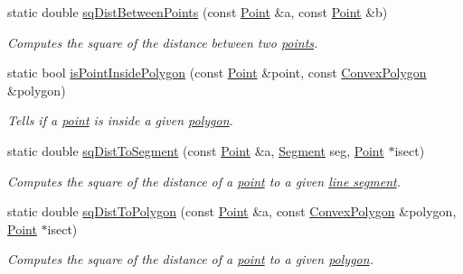\begin{DoxyCompactItemize}
static double \hyperlink{classPathFinder_a6757759823a710c8159d2d5f25912a62}{sqDistBetweenPoints} (const \hyperlink{structPathFinder_1_1Point}{Point} \&a, const \hyperlink{structPathFinder_1_1Point}{Point} \&b)
\begin{DoxyCompactList}\small\item\em Computes the square of the distance between two \hyperlink{structPathFinder_1_1Point}{points}. \item\end{DoxyCompactList}\item 
static bool \hyperlink{classPathFinder_a06935489b090eb301d58a27a461c556f}{isPointInsidePolygon} (const \hyperlink{structPathFinder_1_1Point}{Point} \&point, const \hyperlink{structPathFinder_1_1ConvexPolygon}{ConvexPolygon} \&polygon)
\begin{DoxyCompactList}\small\item\em Tells if a \hyperlink{structPathFinder_1_1Point}{point} is inside a given \hyperlink{structPathFinder_1_1ConvexPolygon}{polygon}. \item\end{DoxyCompactList}\item 
static double \hyperlink{classPathFinder_acd6d78c6d37c94e7ba8da35b02ed9a09}{sqDistToSegment} (const \hyperlink{structPathFinder_1_1Point}{Point} \&a, \hyperlink{structPathFinder_1_1Segment}{Segment} seg, \hyperlink{structPathFinder_1_1Point}{Point} $\ast$isect)
\begin{DoxyCompactList}\small\item\em Computes the square of the distance of a \hyperlink{structPathFinder_1_1Point}{point} to a given \hyperlink{structPathFinder_1_1Segment}{line segment}. \item\end{DoxyCompactList}\item 
static double \hyperlink{classPathFinder_a3589d5058e4a670c525379ae3474ddcc}{sqDistToPolygon} (const \hyperlink{structPathFinder_1_1Point}{Point} \&a, const \hyperlink{structPathFinder_1_1ConvexPolygon}{ConvexPolygon} \&polygon, \hyperlink{structPathFinder_1_1Point}{Point} $\ast$isect)
\begin{DoxyCompactList}\small\item\em Computes the square of the distance of a \hyperlink{structPathFinder_1_1Point}{point} to a given \hyperlink{structPathFinder_1_1ConvexPolygon}{polygon}. \item\end{DoxyCompactList}\end{DoxyCompactItemize}
